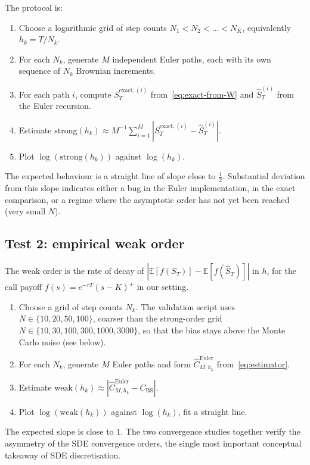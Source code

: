 \documentclass[11pt,a4paper]{article}
\theoremstyle{plain}
\theoremstyle{definition}
\theoremstyle{remark}
\newcommand{\E}{\mathbb{E}}
\begin{document}
The protocol is:
\begin{enumerate}
\item Choose a logarithmic grid of step counts $N_1 < N_2 < \ldots <
N_K$, equivalently $h_k = T/N_k$.
\item For each $N_k$, generate $M$ independent Euler paths, each with
its own sequence of $N_k$ Brownian increments.
\item For each path $i$, compute $S_T^{\mathrm{exact}, (i)}$
from~\eqref{eq:exact-from-W} and $\hat S_T^{(i)}$ from the Euler
recursion.
\item Estimate $\mathrm{strong}(h_k) \approx M^{-1} \sum_{i=1}^{M}
|S_T^{\mathrm{exact}, (i)} - \hat S_T^{(i)}|$.
\item Plot $\log(\mathrm{strong}(h_k))$ against $\log(h_k)$.
\end{enumerate}
The expected behaviour is a straight line of slope close to
$\tfrac{1}{2}$. Substantial deviation from this slope indicates
either a bug in the Euler implementation, in the exact comparison, or
a regime where the asymptotic order has not yet been reached (very
small $N$).

\subsection{Test 2: empirical weak order}

The weak order is the rate of decay of $|\E[f(S_T)] - \E[f(\hat S_T)]|$
in $h$, for the call payoff $f(s) = e^{-rT}(s - K)^+$ in our setting.

\begin{enumerate}
\item Choose a grid of step counts $N_k$. The validation script uses
$N \in \{10, 20, 50, 100\}$, coarser than the strong-order grid
$N \in \{10, 30, 100, 300, 1000, 3000\}$, so that the bias stays above
the Monte Carlo noise (see below).
\item For each $N_k$, generate $M$ Euler paths and form
$\hat C_{M, h_k}^{\mathrm{Euler}}$ from~\eqref{eq:estimator}.
\item Estimate $\mathrm{weak}(h_k) \approx |\hat C_{M, h_k}^{\mathrm{Euler}}
- C_{\mathrm{BS}}|$.
\item Plot $\log(\mathrm{weak}(h_k))$ against $\log(h_k)$, fit a
straight line.
\end{enumerate}
The expected slope is close to $1$. The two convergence studies
together verify the asymmetry of the SDE convergence orders, the
single most important conceptual takeaway of SDE discretisation.
\end{document}
